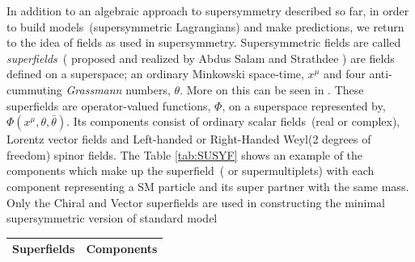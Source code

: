 In addition to an algebraic approach to supersymmetry described so far, in order to build models~(supersymmetric Lagrangians) and make predictions, we return to the idea of fields as used in supersymmetry. Supersymmetric fields are called \textit{superfields}~( proposed and realized by Abdus Salam and Strathdee \cite{SALAM}) are fields defined on a superspace; an ordinary Minkowski space-time, $x^{\mu}$ and four anti-cummuting \textit{Grassmann} numbers, $\theta$. More on this can be seen in  \cite{SM}.
These superfields are operator-valued functions, \textbf{$\Phi$}, on a superspace represented by, \textbf{$\Phi\left(x^{\mu},\theta,\bar{\theta}\right)$}.
Its components consist of ordinary scalar fields~(real or complex), Lorentz vector fields and Left-handed or Right-Handed Weyl(2 degrees of freedom) spinor fields.
The Table \ref{tab:SUSYF} shows an example of the components which make up the  superfield~( or supermultiplets) with each component representing a SM particle and its super partner with the same mass. Only the Chiral and Vector  superfields are used in constructing the minimal supersymmetric version of standard model

\begin{center}
\centering
\begin{tabular}{c c}
\hline
\bfseries{Superfields} & \bfseries {Components}\\
\hline

\hline \hline
\end{tabular}
\label{tab:SUSYF} 
\end{center}

